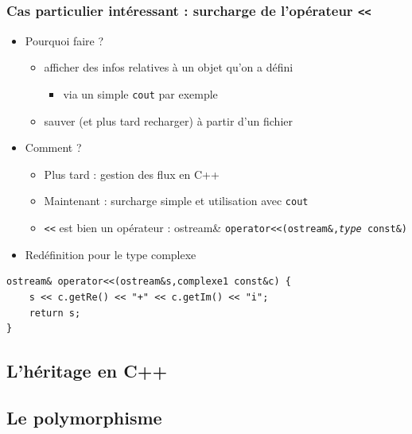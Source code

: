 \begin{frame}[fragile]
\frametitle{Cas particulier intéressant : surcharge de l'opérateur
\texttt{\textless{}\textless{}}}

\begin{itemize}
\itemsep1pt\parskip0pt
\item
  Pourquoi faire ?

  \begin{itemize}
  \itemsep1pt\parskip0pt
  \item
    afficher des infos relatives à un objet qu'on a défini

    \begin{itemize}
    \itemsep1pt\parskip0pt
    \item
      via un simple \texttt{cout} par exemple
    \end{itemize}
  \item
    sauver (et plus tard recharger) à partir d'un fichier
  \end{itemize}
\item
  Comment ?

  \begin{itemize}
  \itemsep1pt\parskip0pt
  \item
    Plus tard : gestion des flux en C++
  \item
    Maintenant : surcharge simple et utilisation avec \texttt{cout}
  \item
    \texttt{\textless{}\textless{}} est bien un opérateur : ostream\&
    \texttt{operator\textless{}\textless{}(ostream\&,\emph{type} const\&)}
  \end{itemize}
\item
  Redéfinition pour le type complexe
\end{itemize}
\begin{lstlisting}
ostream& operator<<(ostream&s,complexe1 const&c) {
    s << c.getRe() << "+" << c.getIm() << "i";
    return s;
}
\end{lstlisting}
\end{frame}


\subsection{L'héritage en C++}




\subsection{Le polymorphisme}

